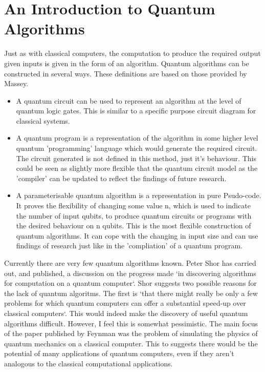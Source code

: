 \documentclass[authoryearcitations]{UoYCSproject}
\begin{document}
\section{An Introduction to Quantum Algorithms}

Just as with classical computers, the computation to produce the required output given inputs is given in the form of an algorithm.
Quantum algorithms can be constructed in several ways. These definitions are based on those provided by Massey\cite{masseythesis}.

\begin{itemize}
\item A quantum circuit can be used to represent an algorithm at the level of quantum logic gates.
This is similar to a specific purpose circuit diagram for classical systems.
\item A quantum program is a representation of the algorithm in some higher level quantum 'programming' language which would generate the required circuit.
The circuit generated is not defined in this method, just it's behaviour.
This could be seen as slightly more flexible that the quantum circuit model as the 'compiler' can be updated to reflect the findings of future research.
\item A parameterisable quantum algorithm is a representation in pure Psudo-code.
It proves the flexibility of changing some value n, which is used to indicate the number of input qubits, to produce quantum circuits or programs with the desired behaviour on n qubits.
This is the most flexible construction of quantum algorithms.
It can cope with the changing in input size and can use findings of research just like in the 'compliation' of a quantum program.
\end{itemize}

Currently there are very few quantum algorithms known.
Peter Shor has carried out, and published, a discussion on the progress made `in discovering algorithms for computation on a quantum computer`\cite{Shor:2004:PQA:1032132.1032149}.
Shor suggests two possible reasons for the lack of quantum algoritms.
The first is `that there might really be only a few problems for which quantum computers can offer a substantial speed-up over classical computers`\cite{Shor:2004:PQA:1032132.1032149}.
This would indeed make the discovery of useful quantum algorithms difficult.
However, I feel this is somewhat pessimistic.
The main focus of the paper published by Feynman\cite{Feynman82simulatingphysics} was the problem of simulating the physics of quantum mechanics on a classical computer.
This to suggests there would be the potential of many applications of quantum computers, even if they aren't analogous to the classical computational applications.
\end{document}
